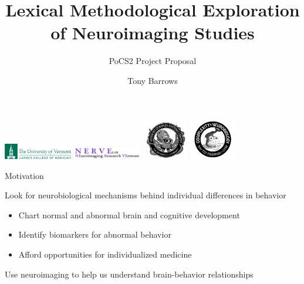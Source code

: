 \documentclass[aspectratio=169]{beamer}
\title[Brainwise Wordsearch]{Lexical Methodological Exploration of Neuroimaging Studies}
\subtitle[]{PoCS2 Project Proposal}
\date{}
\author[Tony Barrows]{Tony Barrows}
\begin{document}
	
	\begin{frame}
		\maketitle
		
		\centering
		\includegraphics[width=3cm]{larner}
		\includegraphics[width=3cm]{nerve}
		\includegraphics[width=2cm]{complexsystems}
		\includegraphics[width=2cm]{complexbrain}
	\end{frame}
	

\begin{frame}{Motivation}

	Look for neurobiological mechanisms behind individual differences in behavior
	
	\begin{itemize}
		\item Chart normal and abnormal brain and cognitive development
		\item Identify biomarkers for abnormal behavior
		\item Afford opportunities for individualized medicine
	\end{itemize}

	\begin{block}{}
		Use neuroimaging to help us understand brain-behavior relationships
	\end{block}
\end{frame}
\end{document}
